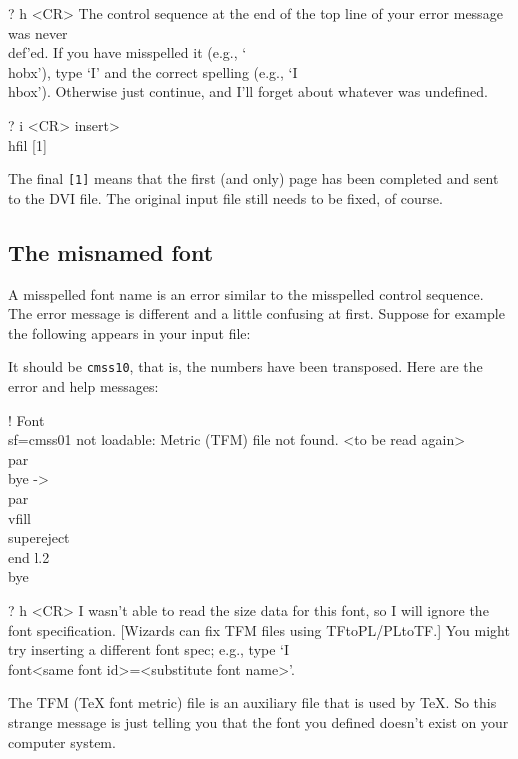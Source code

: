 \beginuser 
? h <CR> 
The control sequence at the end of the top line 
of your error message was never \\def'ed. If you have 
misspelled it (e.g., `\\hobx'), type `I' and the correct 
spelling (e.g., `I\\hbox'). Otherwise just continue, 
and I'll forget about whatever was undefined. 

? i <CR> 
insert>\\hfil 
[1] 
\enduser 

The final {\tt [1]} means that the first (and only) page has 
been completed and sent to the DVI file.  The original input file 
still needs to be fixed, of course. 

\subsection{The misnamed font} 

A misspelled font name is an error similar to the misspelled 
control sequence.  The error message is different and a little 
confusing at first. Suppose for example the following appears in 
your input file: 


It should be {\tt cmss10}, that is, the numbers have been 
transposed.  Here are the error and help messages: 

\beginuser \obeyspaces 
! Font \\sf=cmss01 not loadable: Metric (TFM) file not found. 
<to be read again> 
\                   \\par 
\\bye ->\\par 
\            \\vfill \\supereject \\end 
l.2 \\bye 

? h <CR> 
I wasn't able to read the size data for this font, 
so I will ignore the font specification. 
[Wizards can fix TFM files using TFtoPL/PLtoTF.] 
You might try inserting a different font spec; 
e.g., type `I\\font<same font id>=<substitute font name>'. 
\enduser 

The TFM (\TeX{} font metric) file is an auxiliary file that is 
used by \TeX\null. So this strange message is just telling you 
that the font you defined doesn't exist on your computer system. 

